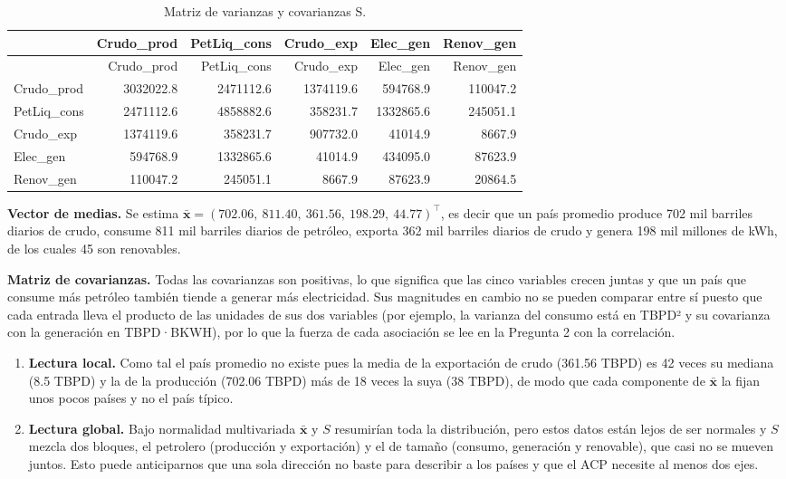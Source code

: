 \documentclass[oneside, openany, fontset=libertinus]{mitthesis}
\providecommand{\tightlist}{\setlength{\itemsep}{0pt}\setlength{\parskip}{0pt}}
\begin{document}
\Needspace{2.12in}

\begin{longtable}[]{@{}lrrrrr@{}}
\caption{Matriz de varianzas y covarianzas S.}\tabularnewline
\toprule\noalign{}
& Crudo\_prod & PetLiq\_cons & Crudo\_exp & Elec\_gen & Renov\_gen \\
\midrule\noalign{}
\endfirsthead
\toprule\noalign{}
& Crudo\_prod & PetLiq\_cons & Crudo\_exp & Elec\_gen & Renov\_gen \\
\midrule\noalign{}
\endhead
\bottomrule\noalign{}
\endlastfoot
Crudo\_prod & 3032022.8 & 2471112.6 & 1374119.6 & 594768.9 & 110047.2 \\
PetLiq\_cons & 2471112.6 & 4858882.6 & 358231.7 & 1332865.6 &
245051.1 \\
Crudo\_exp & 1374119.6 & 358231.7 & 907732.0 & 41014.9 & 8667.9 \\
Elec\_gen & 594768.9 & 1332865.6 & 41014.9 & 434095.0 & 87623.9 \\
Renov\_gen & 110047.2 & 245051.1 & 8667.9 & 87623.9 & 20864.5 \\
\end{longtable}

\textbf{Vector de medias.} Se estima
\(\bar{\mathbf{x}} = (702.06,\ 811.40,\ 361.56,\ 198.29,\ 44.77)^\top\),
es decir que un país promedio produce 702 mil barriles diarios de crudo,
consume 811 mil barriles diarios de petróleo, exporta 362 mil barriles
diarios de crudo y genera 198 mil millones de kWh, de los cuales 45 son
renovables.

\textbf{Matriz de covarianzas.} Todas las covarianzas son positivas, lo
que significa que las cinco variables crecen juntas y que un país que
consume más petróleo también tiende a generar más electricidad. Sus
magnitudes en cambio no se pueden comparar entre sí puesto que cada
entrada lleva el producto de las unidades de sus dos variables (por
ejemplo, la varianza del consumo está en TBPD² y su covarianza con la
generación en TBPD·BKWH), por lo que la fuerza de cada asociación se lee
en la Pregunta 2 con la correlación.

\begin{enumerate}
\def\labelenumi{\alph{enumi}.}
\tightlist
\item
  \textbf{Lectura local.} Como tal el país promedio no existe pues la
  media de la exportación de crudo (361.56 TBPD) es 42 veces su mediana
  (8.5 TBPD) y la de la producción (702.06 TBPD) más de 18 veces la suya
  (38 TBPD), de modo que cada componente de \(\bar{\mathbf{x}}\) la
  fijan unos pocos países y no el país típico.
\item
  \textbf{Lectura global.} Bajo normalidad multivariada
  \(\bar{\mathbf{x}}\) y \(S\) resumirían toda la distribución, pero
  estos datos están lejos de ser normales y \(S\) mezcla dos bloques, el
  petrolero (producción y exportación) y el de tamaño (consumo,
  generación y renovable), que casi no se mueven juntos. Esto puede
  anticiparnos que una sola dirección no baste para describir a los
  países y que el ACP necesite al menos dos ejes.
\end{enumerate}
\end{document}
